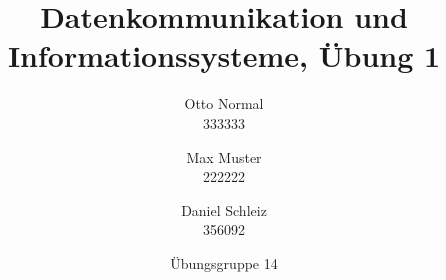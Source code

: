 \documentclass{../exercisesheet}
\title{Datenkommunikation und Informationssysteme, Übung 1}
\author{
    Otto Normal \\ 333333
    \and
    Max Muster \\ 222222
    \and 
    Daniel Schleiz \\ 356092
}
\date{Übungsgruppe 14}
\begin{document}
\maketitle
\pointtable

\begin{exercise}{3}
	
\end{exercise}


\begin{exercise}{5}
	\begin{subexercise}
		
	\end{subexercise}

	\begin{subexercise}
		  
	\end{subexercise}
\end{exercise}


\begin{exercise}{2}
	\begin{subexercise}
		
	\end{subexercise}

	\begin{subexercise}
		
	\end{subexercise}

	\begin{subexercise}
		
	\end{subexercise}

	\begin{subexercise}
		  
	\end{subexercise}
\end{exercise}

\begin{exercise}{1.5}
	
\end{exercise}

\begin{exercise}{3.5}
	\begin{subexercise}
		
	\end{subexercise}

	\begin{subexercise}
		  
	\end{subexercise}
\end{exercise}
\end{document}

